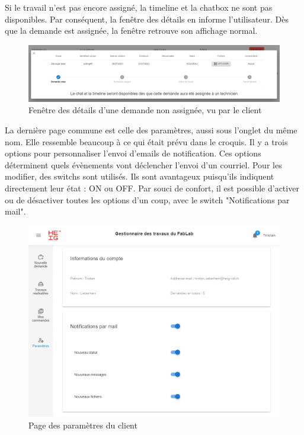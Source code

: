 \documentclass[
    iai, %
    eai, %
]{heig-tb}
\begin{document}
\newpage
Si le travail n'est pas encore assigné, la timeline et la chatbox ne sont pas disponibles. Par conséquent, la fenêtre des détails en informe l'utilisateur.
Dès que la demande est assignée, la fenêtre retrouve son affichage normal.

\begin{figure}[h]
  \includegraphics[width=14cm]{ui_jobinfo_client1.PNG}
  \caption{Fenêtre des détails d'une demande non assignée, vu par le client}
\end{figure}

La dernière page commune est celle des paramètres, aussi sous l'onglet du même nom. Elle ressemble beaucoup à ce qui était prévu dans le croquis.
Il y a trois options pour personnaliser l'envoi d'emails de notification. Ces options déterminent quels évènements vont déclencher l'envoi d'un courriel.
Pour les modifier, des switchs sont utilisés. Ils sont avantageux puisqu'ils indiquent directement leur état : ON ou OFF.
Par souci de confort, il est possible d'activer ou de désactiver toutes les options d'un coup, avec le switch "Notifications par mail".

\begin{figure}[h]
  \includegraphics[width=14cm]{ui_settings_page.PNG}
  \caption{Page des paramètres du client}
\end{figure}
\end{document}
